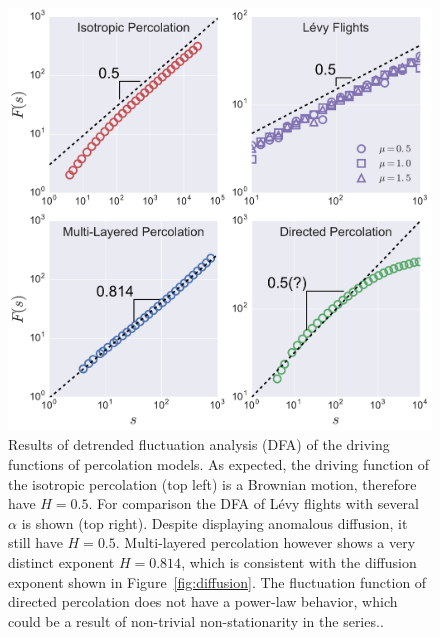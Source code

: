 \begin{figure}
\begin{center}
    \includegraphics[scale=0.45]{chapters/ch6-asle/figs/dfaresults}
\end{center}
\caption{Results of detrended fluctuation analysis (DFA) of the driving
    functions of percolation models. As expected, the driving function of the
    isotropic percolation (top left) is a Brownian motion, therefore have
    $H=0.5$. For comparison the DFA of L\'evy flights with several $\alpha$ is
    shown (top right). Despite displaying anomalous diffusion, it still have
    $H=0.5$. Multi-layered percolation however shows a very distinct exponent
    $H=0.814$, which is consistent with the diffusion exponent shown in
    Figure~\ref{fig:diffusion}. The fluctuation function of directed
    percolation does not have a power-law behavior, which could be a result of
    non-trivial non-stationarity in the series..}
\label{fig:dfaresults}
\end{figure}

